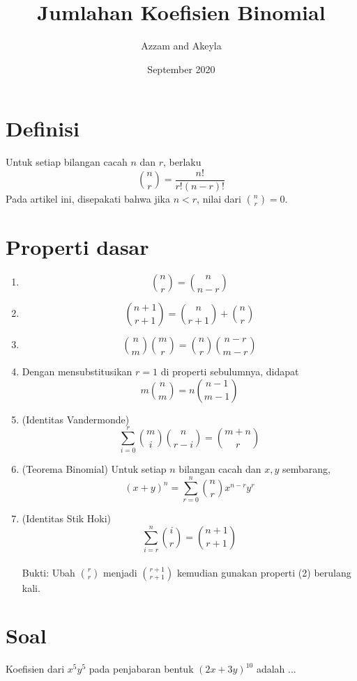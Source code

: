 \documentclass[11pt]{scrartcl}
\title{Jumlahan Koefisien Binomial}
\author{Azzam and Akeyla}
\date{September 2020}
\begin{document}
\maketitle

\renewcommand*\contentsname{Daftar Isi}
\tableofcontents

\newpage

\section{Definisi}
Untuk setiap bilangan cacah $n$ dan $r$, berlaku $$\binom{n}{r} = \frac{n!}{r!(n-r)!}$$
Pada artikel ini, disepakati bahwa jika $n<r$, nilai dari $\binom{n}{r} = 0$.

\section{Properti dasar}
\begin{enumerate}
    \item $$\binom{n}{r} =\binom{n}{n-r}$$
    \item $$\binom{n + 1}{r + 1} = \binom{n}{r + 1} + \binom{n}{r}$$
    \item $$\binom{n}{m}\binom{m}{r} = \binom{n}{r}\binom{n-r}{m-r}$$
    \item Dengan mensubstitusikan $r = 1$ di properti sebulumnya, didapat
    $$m\binom{n}{m} =n \binom{n - 1}{m - 1}$$
    \item (Identitas Vandermonde) $$\sum_{i=0}^{r} \binom{m}{i} \binom{n}{r - i} = \binom{m+n}{r}$$
    \item (Teorema Binomial) Untuk setiap $n$ bilangan cacah dan $x,y$ sembarang,
    $$(x+y)^n = \sum_{r = 0}^n \binom{n}{r} x^{n-r}y^r$$
    \item (Identitas Stik Hoki) $$\sum_{i = r}^n \binom{i}{r} = \binom{n+1}{r+1}$$
    \\ Bukti: Ubah $\binom{r}{r}$ menjadi $\binom{r+1}{r+1}$ kemudian gunakan properti (2) berulang kali.
\end{enumerate}

\section{Soal}
\begin{problem}
Koefisien dari $x^5y^5$ pada penjabaran bentuk $(2x + 3y)^{10}$ adalah ...
\end{problem}
\end{document}
